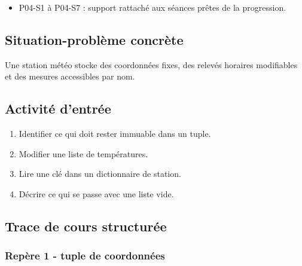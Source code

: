 \begin{itemize}
\tightlist
\item
  P04-S1 à P04-S7 : support rattaché aux séances prêtes de la
  progression.
\end{itemize}

\subsection{Situation-problème concrète}

Une station météo stocke des coordonnées fixes, des relevés horaires
modifiables et des mesures accessibles par nom.

\subsection{Activité d’entrée}

\begin{enumerate}
\def\labelenumi{\arabic{enumi}.}
\tightlist
\item
  Identifier ce qui doit rester immuable dans un tuple.
\item
  Modifier une liste de températures.
\item
  Lire une clé dans un dictionnaire de station.
\item
  Décrire ce qui se passe avec une liste vide.
\end{enumerate}

\subsection{Trace de cours structurée}

\subsubsection{Repère 1 - tuple de coordonnées}

